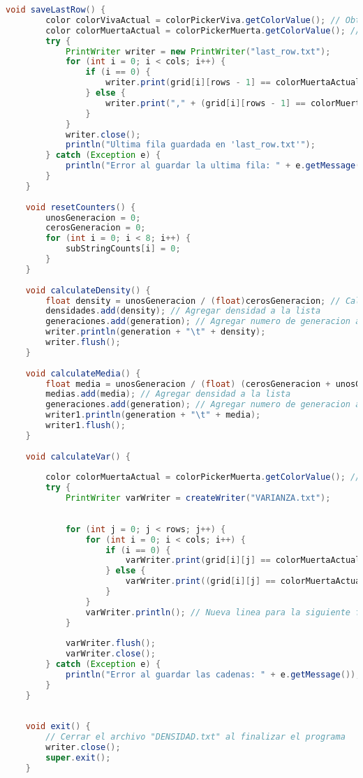 \documentclass{article}
\begin{document}
\begin{lstlisting}[language=Java, basicstyle=\tiny, breaklines=true, breakatwhitespace=true]
	void saveLastRow() {
		color colorVivaActual = colorPickerViva.getColorValue(); // Obtener el color actual de celda viva
		color colorMuertaActual = colorPickerMuerta.getColorValue(); // Obtener el color actual de celda muerta
		try {
			PrintWriter writer = new PrintWriter("last_row.txt");
			for (int i = 0; i < cols; i++) {
				if (i == 0) {
					writer.print(grid[i][rows - 1] == colorMuertaActual ? "0" : "1");
				} else {
					writer.print("," + (grid[i][rows - 1] == colorMuertaActual ? "0" : "1"));
				}
			}
			writer.close();
			println("Ultima fila guardada en 'last_row.txt'");
		} catch (Exception e) {
			println("Error al guardar la ultima fila: " + e.getMessage());
		}
	}
	
	void resetCounters() {
		unosGeneracion = 0;
		cerosGeneracion = 0;
		for (int i = 0; i < 8; i++) {
			subStringCounts[i] = 0;
		}
	}
	
	void calculateDensity() {
		float density = unosGeneracion / (float)cerosGeneracion; // Calcular densidad
		densidades.add(density); // Agregar densidad a la lista
		generaciones.add(generation); // Agregar numero de generacion a la lista
		writer.println(generation + "\t" + density);
		writer.flush();
	}
	
	void calculateMedia() {
		float media = unosGeneracion / (float) (cerosGeneracion + unosGeneracion); // Calcular densidad
		medias.add(media); // Agregar densidad a la lista
		generaciones.add(generation); // Agregar numero de generacion a la lista
		writer1.println(generation + "\t" + media);
		writer1.flush();
	}
	
	void calculateVar() {
		
		color colorMuertaActual = colorPickerMuerta.getColorValue(); // Obtener el color actual de celda muerta
		try {
			PrintWriter varWriter = createWriter("VARIANZA.txt");
			
			
			for (int j = 0; j < rows; j++) {
				for (int i = 0; i < cols; i++) {
					if (i == 0) {
						varWriter.print(grid[i][j] == colorMuertaActual ? "0" : "1");
					} else {
						varWriter.print((grid[i][j] == colorMuertaActual ? "0" : "1"));
					}
				}
				varWriter.println(); // Nueva linea para la siguiente fila
			}
			
			varWriter.flush();
			varWriter.close();
		} catch (Exception e) {
			println("Error al guardar las cadenas: " + e.getMessage());
		}
	}
	
	
	void exit() {
		// Cerrar el archivo "DENSIDAD.txt" al finalizar el programa
		writer.close();
		super.exit();
	}
	

\end{lstlisting}
\end{document}
